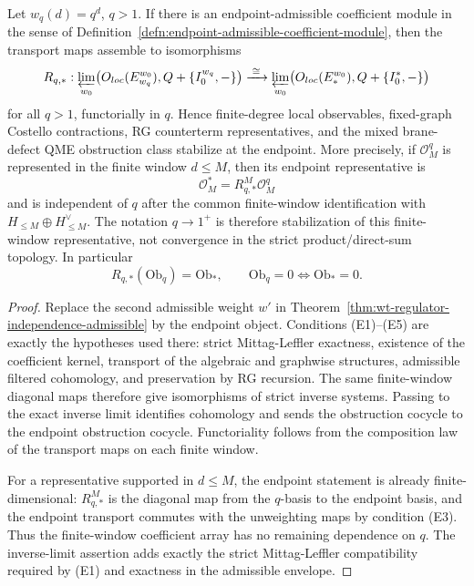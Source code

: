 \begin{thm}
\label{thm:wt-endpoint-stabilization-criterion}
  Let \(w_q(d)=q^d\), \(q>1\).  If there is an endpoint-admissible
  coefficient module in the sense of
  Definition~\ref{defn:endpoint-admissible-coefficient-module}, then
  the transport maps assemble to isomorphisms
  \[
    R_{q,\ast}\colon
    \varprojlim_{w_0}
    \bigl(\mathcal O_{\mathrm{loc}}(\mathcal E_{w_q}^{w_0}),
      Q+\{I_0^{w_q},-\}\bigr)
    \xrightarrow{\;\cong\;}
    \varprojlim_{w_0}
    \bigl(\mathcal O_{\mathrm{loc}}(\mathcal E_{\ast}^{w_0}),
      Q+\{I_0^{\ast},-\}\bigr)
  \]
  for all \(q>1\), functorially in \(q\).  Hence finite-degree local
  observables, fixed-graph Costello contractions, RG counterterm
  representatives, and the mixed brane-defect QME obstruction class
  stabilize at the endpoint.  More precisely, if
  \(\mathcal O^q_M\) is represented in the finite window \(d\leq M\),
  then its endpoint representative is
  \[
    \mathcal O^\ast_M=R^M_{q,\ast}\mathcal O^q_M
  \]
  and is independent of \(q\) after the common finite-window
  identification with \(H_{\leq M}\oplus H^\vee_{\leq M}\).  The notation
  \(q\to1^+\) is therefore stabilization of this finite-window
  representative, not convergence in the strict product/direct-sum
  topology.  In particular
  \[
    R_{q,\ast}(\mathrm{Ob}_{q})=\mathrm{Ob}_{\ast},
    \qquad
    \mathrm{Ob}_{q}=0\Longleftrightarrow \mathrm{Ob}_{\ast}=0 .
  \]
\end{thm}

\begin{proof}
  Replace the second admissible weight \(w'\) in
  Theorem~\ref{thm:wt-regulator-independence-admissible} by the
  endpoint object.  Conditions (E1)--(E5) are exactly the hypotheses
  used there: strict Mittag-Leffler exactness, existence of the
  coefficient kernel, transport of the algebraic and graphwise
  structures, admissible filtered cohomology, and preservation by RG
  recursion.  The same finite-window diagonal maps therefore give
  isomorphisms of strict inverse systems.  Passing to the exact inverse
  limit identifies cohomology and sends the obstruction cocycle to the
  endpoint obstruction cocycle.  Functoriality follows from the
  composition law of the transport maps on each finite window.

  For a representative supported in \(d\leq M\), the endpoint statement is
  already finite-dimensional: \(R^M_{q,\ast}\) is the diagonal map from
  the \(q\)-basis to the endpoint basis, and the endpoint transport
  commutes with the unweighting maps by condition (E3).  Thus the
  finite-window coefficient array has no remaining dependence on \(q\).
  The inverse-limit assertion adds exactly the strict Mittag-Leffler
  compatibility required by (E1) and exactness in the admissible envelope.
\end{proof}


